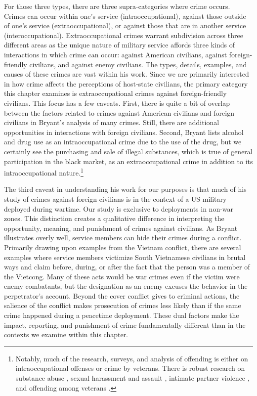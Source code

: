 For those three types, there are three supra-categories where crime occurs. Crimes can occur within one's service (intraoccupational), against those outside of one's service (extraoccupational), or against those that are in another service (interoccupational). Extraoccupational crimes warrant subdivision across three different areas as the unique nature of military service affords three kinds of interactions in which crime can occur: against American civilians, against foreign-friendly civilians, and against enemy civilians.  The types, details, examples, and causes of these crimes are vast within his work. Since we are primarily interested in how crime affects the perceptions of host-state civilians, the primary category this chapter examines is extraoccupational crimes against foreign-friendly civilians. This focus has a few caveats. First, there is quite a bit of overlap between the factors related to crimes against American civilians and foreign civilians in Bryant's analysis of many crimes. Still, there are additional opportunities in interactions with foreign civilians. Second, Bryant lists alcohol and drug use as an intraoccupational crime due to the use of the drug, but we certainly see the purchasing and sale of illegal substances, which is true of general participation in the black market, as an extraoccupational crime in addition to its intraoccupational nature.\footnote{Notably, much of the research, surveys, and analysis of offending is either on intraoccupational offenses or crime by veterans. There is robust research on substance abuse \cite{bray2010}, sexual harassment and assault \cite{bostock2007,stander2016}, intimate partner violence \cite{sparrow2020}, and offending among veterans \cite{moorhead2021}.}

The third caveat in understanding his work for our purposes is that much of his study of crimes against foreign civilians is in the context of a US military deployed during wartime. Our study is exclusive to deployments in non-war zones. This distinction creates a qualitative difference in interpreting the opportunity, meaning, and punishment of crimes against civilians. As Bryant illustrates overly well, service members can hide their crimes during a conflict. Primarily drawing upon examples from the Vietnam conflict, there are several examples where service members victimize South Vietnamese civilians in brutal ways and claim before, during, or after the fact that the person was a member of the Vietcong. Many of these acts would be war crimes even if the victim were enemy combatants, but the designation as an enemy excuses the behavior in the perpetrator's account. Beyond the cover conflict gives to criminal actions, the salience of the conflict makes prosecution of crimes less likely than if the same crime happened during a peacetime deployment. These dual factors make the impact, reporting, and punishment of crime fundamentally different than in the contexts we examine within this chapter.  

